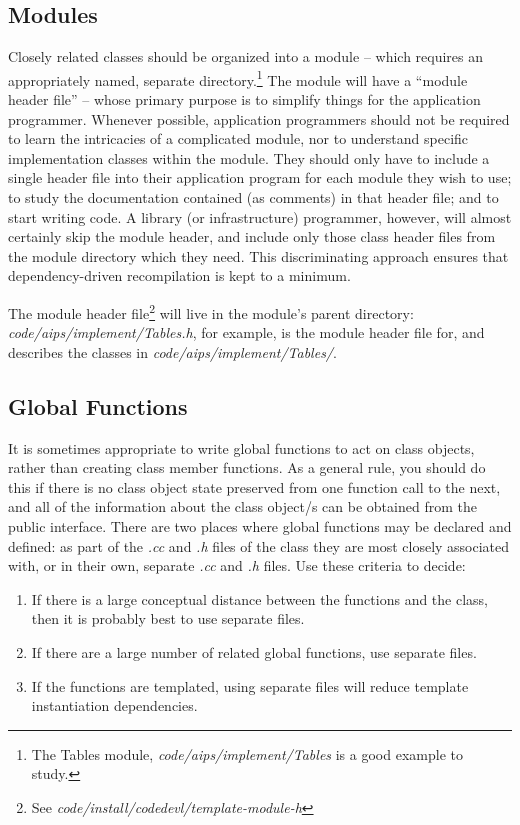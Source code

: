 \subsection {Modules} Closely related classes should be organized into a module
-- which requires an appropriately named, separate directory.\footnote
{The Tables module, {\em code/aips/implement/Tables} is a good example to 
study.}  The module will have a ``module header file'' -- whose primary 
purpose is to simplify things for the application programmer.  Whenever 
possible, application programmers should not be required to learn the
intricacies of a complicated module, nor to understand specific
implementation classes within the module.  They should only have to
include a single header file into their application program for each
module they wish to use; to study the documentation contained (as
comments) in that header file; and to start writing code.  A library
(or infrastructure) programmer, however, will almost certainly skip
the module header, and include only those class header files from the
module directory which they need.  This discriminating approach ensures
that dependency-driven recompilation is kept to a minimum.

The module header file\footnote{See {\em
code/install/codedevl/template-module-h}} will live in the module's parent
directory: {\em code/aips/implement/Tables.h}, for example, is the module
header file for, and describes the classes in {\em code/aips/implement/Tables/}.
\subsection {Global Functions} It is sometimes appropriate to write
global functions to act on class objects, rather than creating
class member functions.  As a general rule, you should do this if
there is no class object state preserved from one function call to the next,
and all of the information about the class object/s can be obtained
from the public interface.  There are two places where global functions
may be declared and defined:  as part of the {\em .cc} and {\em .h} files
of the class they are most closely associated with, or in their own, separate 
{\em .cc} and {\em .h} files.  Use these criteria to decide:
\begin{enumerate}
\item If there is a large conceptual distance between the functions and
the class, then it is probably best to use separate files.
\item If there are a large number of related global functions, use
separate files.
\item If the functions are templated, using separate files will reduce
template instantiation dependencies.
\end{enumerate}
